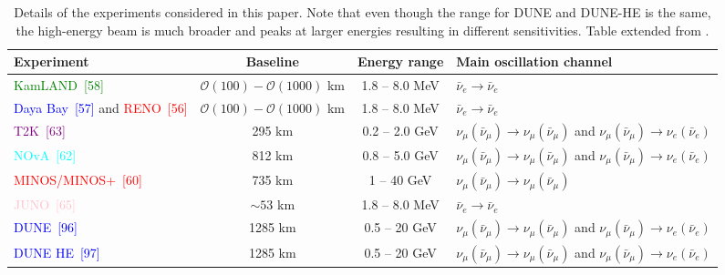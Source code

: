 \begin{table}[H]
\centering
\caption{Details of the experiments considered in this paper. Note that even though the range for DUNE and DUNE-HE is the same, the high-energy beam is much broader and peaks at larger energies resulting in different sensitivities. Table extended from \cite{DeRomeri:2023dht}.}
\label{tab:experiments}
\begin{tabular}{|l|c|c|l|}
\hline
\textbf{Experiment} & \textbf{Baseline} & \textbf{Energy range} & \textbf{Main oscillation channel} \\ \hline
\textcolor{green}{KamLAND~[58]} & $\mathcal{O}(100)-\mathcal{O}(1000)$ km & 1.8 -- 8.0 MeV & $\bar{\nu}_e \rightarrow \bar{\nu}_e$ \\ \hline
\textcolor{blue}{Daya Bay~[57]} and \textcolor{red}{RENO~[56]} & $\mathcal{O}(100)-\mathcal{O}(1000)$ km & 1.8 -- 8.0 MeV & $\bar{\nu}_e \rightarrow \bar{\nu}_e$ \\ \hline
\textcolor{purple}{T2K~[63]} & 295 km & 0.2 -- 2.0 GeV & $\nu_\mu (\bar{\nu}_\mu) \rightarrow \nu_\mu (\bar{\nu}_\mu)$ and $\nu_\mu (\bar{\nu}_\mu) \rightarrow \nu_e (\bar{\nu}_e)$ \\ \hline
\textcolor{cyan}{NOvA~[62]} & 812 km & 0.8 -- 5.0 GeV & $\nu_\mu (\bar{\nu}_\mu) \rightarrow \nu_\mu (\bar{\nu}_\mu)$ and $\nu_\mu (\bar{\nu}_\mu) \rightarrow \nu_e (\bar{\nu}_e)$ \\ \hline
\textcolor{red}{MINOS/MINOS+~[60]} & 735 km & 1 -- 40 GeV & $\nu_\mu (\bar{\nu}_\mu) \rightarrow \nu_\mu (\bar{\nu}_\mu)$ \\ \hline
\textcolor{pink}{JUNO~[65]} & $\sim 53$ km & 1.8 -- 8.0 MeV & $\bar{\nu}_e \rightarrow \bar{\nu}_e$ \\ \hline
\textcolor{blue}{DUNE~[96]} & 1285 km & 0.5 -- 20 GeV & $\nu_\mu (\bar{\nu}_\mu) \rightarrow \nu_\mu (\bar{\nu}_\mu)$ and $\nu_\mu (\bar{\nu}_\mu) \rightarrow \nu_e (\bar{\nu}_e)$ \\ \hline
\textcolor{blue}{DUNE HE~[97]} & 1285 km & 0.5 -- 20 GeV & $\nu_\mu (\bar{\nu}_\mu) \rightarrow \nu_\mu (\bar{\nu}_\mu)$ and $\nu_\mu (\bar{\nu}_\mu) \rightarrow \nu_e (\bar{\nu}_e)$ \\ \hline
\end{tabular}
\end{table}

